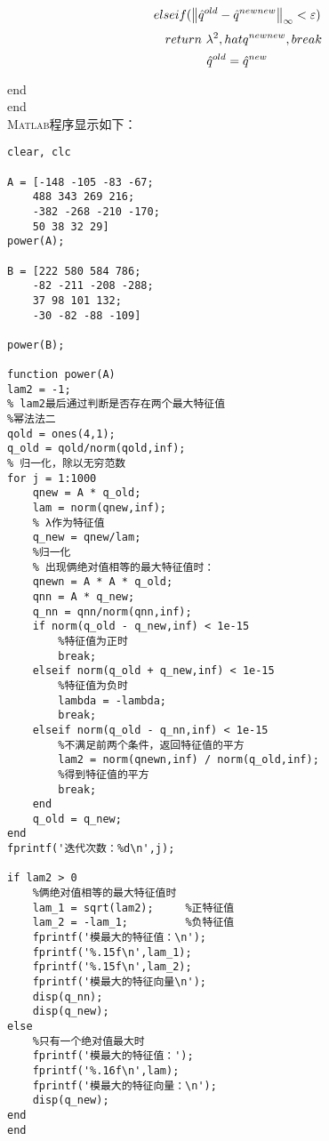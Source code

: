 \documentclass[12pt,a4paper,utf8]{ctexart}
\begin{document}
\begin{enumerate}
\begin{equation}
\end{equation}
\begin{equation}
\quad elseif( \left\|\hat{q}^{old} - \hat{q}^{newnew} \right\|_\infty < \varepsilon)\\
\end{equation}
\begin{equation}
\quad \quad return~ \lambda^2,hat{q}^{newnew},break\\
\end{equation}
\begin{equation}
\quad \hat{q}^{old} = \hat{q}^{new}\\
\end{equation}

end\\
end\\


\textsc{Matlab}程序显示如下：
\begin{lstlisting}[frame=single]
clear, clc

A = [-148 -105 -83 -67;
    488 343 269 216;
    -382 -268 -210 -170;
    50 38 32 29]
power(A);

B = [222 580 584 786;
    -82 -211 -208 -288;
    37 98 101 132;
    -30 -82 -88 -109]

power(B);

function power(A) 
lam2 = -1;
% lam2最后通过判断是否存在两个最大特征值
%幂法法二
qold = ones(4,1);
q_old = qold/norm(qold,inf);
% 归一化，除以无穷范数
for j = 1:1000
    qnew = A * q_old;
    lam = norm(qnew,inf);
    % λ作为特征值
    q_new = qnew/lam;
    %归一化
    % 出现俩绝对值相等的最大特征值时：
    qnewn = A * A * q_old;
    qnn = A * q_new;
    q_nn = qnn/norm(qnn,inf);
    if norm(q_old - q_new,inf) < 1e-15        
        %特征值为正时
        break;
    elseif norm(q_old + q_new,inf) < 1e-15    
        %特征值为负时
        lambda = -lambda;
        break;
    elseif norm(q_old - q_nn,inf) < 1e-15  
        %不满足前两个条件，返回特征值的平方
        lam2 = norm(qnewn,inf) / norm(q_old,inf);
		%得到特征值的平方
        break;
    end
    q_old = q_new;
end
fprintf('迭代次数：%d\n',j);

if lam2 > 0     
    %俩绝对值相等的最大特征值时
    lam_1 = sqrt(lam2);     %正特征值
    lam_2 = -lam_1;         %负特征值
    fprintf('模最大的特征值：\n');
    fprintf('%.15f\n',lam_1);
    fprintf('%.15f\n',lam_2);
    fprintf('模最大的特征向量\n');
    disp(q_nn);
    disp(q_new);
else
    %只有一个绝对值最大时
    fprintf('模最大的特征值：');
    fprintf('%.16f\n',lam);
    fprintf('模最大的特征向量：\n');
    disp(q_new);
end
end
\end{lstlisting}


\end{enumerate}
\end{document}
